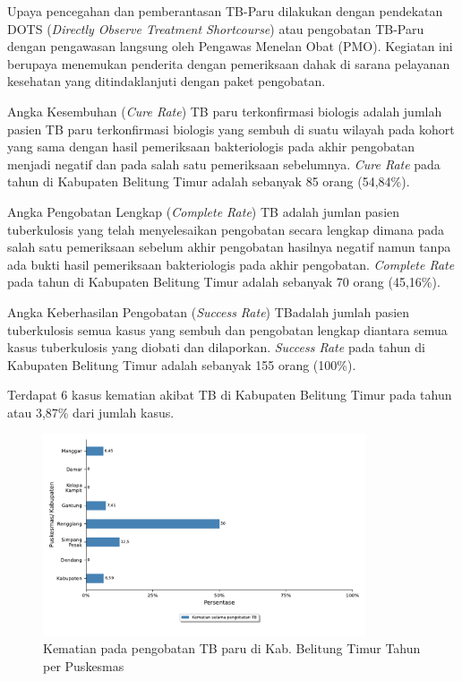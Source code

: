 Upaya pencegahan dan pemberantasan TB-Paru dilakukan dengan pendekatan
DOTS (\emph{Directly Observe Treatment Shortcourse}) atau pengobatan TB-Paru
dengan pengawasan langsung oleh Pengawas Menelan Obat (PMO). Kegiatan
ini berupaya menemukan penderita dengan pemeriksaan dahak di sarana
pelayanan kesehatan yang ditindaklanjuti dengan paket pengobatan.

Angka Kesembuhan (\emph{Cure Rate}) TB paru terkonfirmasi biologis adalah jumlah pasien TB paru terkonfirmasi biologis yang sembuh di suatu wilayah pada kohort yang sama dengan hasil pemeriksaan bakteriologis pada akhir pengobatan menjadi negatif dan pada salah satu pemeriksaan sebelumnya.
\emph{Cure Rate} pada tahun \tP di Kabupaten Belitung Timur adalah sebanyak 85 orang (54,84\%).

Angka Pengobatan Lengkap (\emph{Complete Rate}) TB adalah jumlan pasien tuberkulosis yang telah menyelesaikan pengobatan secara lengkap dimana pada salah satu pemeriksaan sebelum akhir pengobatan hasilnya negatif namun tanpa ada bukti hasil pemeriksaan bakteriologis pada akhir pengobatan.
\emph{Complete Rate} pada tahun \tP di Kabupaten Belitung Timur adalah sebanyak 70 orang (45,16\%).

Angka Keberhasilan Pengobatan (\emph{Success Rate}) TBadalah jumlah pasien tuberkulosis semua kasus yang sembuh dan pengobatan lengkap diantara semua kasus tuberkulosis yang diobati dan dilaporkan.
\emph{Success Rate} pada tahun \tP di Kabupaten Belitung Timur adalah sebanyak 155 orang (100\%).

Terdapat 6 kasus kematian akibat TB di Kabupaten Belitung Timur pada tahun \tPnos atau 3,87\% dari jumlah kasus.

\begin{figure}[H]
	\centering
	\includegraphics[width=0.85\textwidth]{bab_06/bab_06_01c_kematianTB}
	\caption{Kematian pada pengobatan TB paru di Kab. Belitung Timur Tahun \tP per Puskesmas}
	\label{fig:kematian-TB}
\end{figure}

